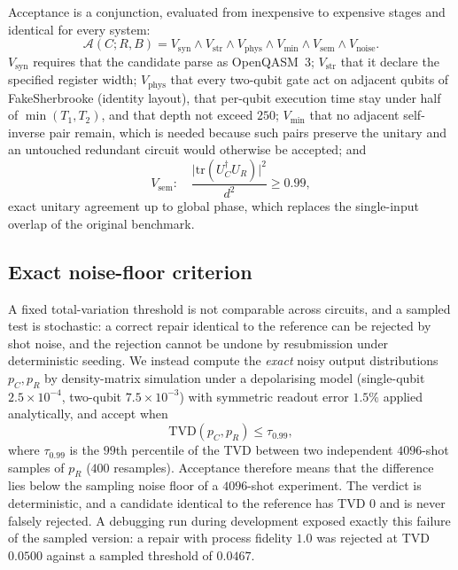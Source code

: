 \documentclass[journal]{IEEEtran}
\begin{document}
Acceptance is a conjunction, evaluated from inexpensive to expensive stages and
identical for every system:
\begin{equation}
\mathcal{A}(C;R,B)=V_{\mathrm{syn}}\wedge V_{\mathrm{str}}\wedge V_{\mathrm{phys}}
\wedge V_{\mathrm{min}}\wedge V_{\mathrm{sem}}\wedge V_{\mathrm{noise}}.
\end{equation}
$V_{\mathrm{syn}}$ requires that the candidate parse as OpenQASM~3; $V_{\mathrm{str}}$
that it declare the specified register width; $V_{\mathrm{phys}}$ that every
two-qubit gate act on adjacent qubits of FakeSherbrooke (identity layout), that
per-qubit execution time stay under half of $\min(T_1,T_2)$, and that depth not
exceed $250$; $V_{\mathrm{min}}$ that no adjacent self-inverse pair remain, which
is needed because such pairs preserve the unitary and an untouched redundant
circuit would otherwise be accepted; and
\begin{equation}
V_{\mathrm{sem}}:\quad \frac{\lvert\mathrm{tr}(U_C^\dagger U_R)\rvert^2}{d^2}\ge 0.99,
\end{equation}
exact unitary agreement up to global phase, which replaces the single-input
overlap of the original benchmark.

\subsection{Exact noise-floor criterion}

A fixed total-variation threshold is not comparable across circuits, and a
sampled test is stochastic: a correct repair identical to the reference can be
rejected by shot noise, and the rejection cannot be undone by resubmission under
deterministic seeding. We instead compute the \emph{exact} noisy output
distributions $p_C,p_R$ by density-matrix simulation under a depolarising model
(single-qubit $2.5\times10^{-4}$, two-qubit $7.5\times10^{-3}$) with symmetric
readout error $1.5\%$ applied analytically, and accept when
\begin{equation}
\mathrm{TVD}(p_C,p_R)\le\tau_{0.99},
\end{equation}
where $\tau_{0.99}$ is the $99$th percentile of the TVD between two independent
$4096$-shot samples of $p_R$ ($400$ resamples). Acceptance therefore means that
the difference lies below the sampling noise floor of a $4096$-shot experiment.
The verdict is deterministic, and a candidate identical to the reference has
TVD $0$ and is never falsely rejected. A debugging run during development
exposed exactly this failure of the sampled version: a repair with process
fidelity $1.0$ was rejected at TVD $0.0500$ against a sampled threshold of
$0.0467$.
\end{document}
